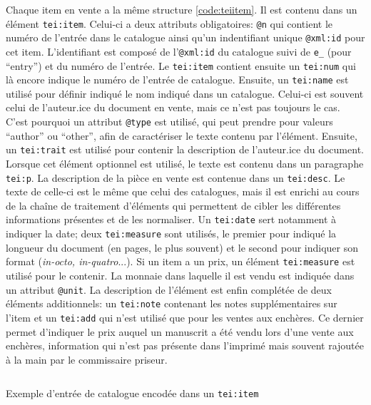 Chaque item en vente a la même structure \ref{code:teiitem}. Il est contenu dans un élément \texttt{tei:item}. Celui-ci a deux attributs obligatoires: \texttt{@n} qui contient le numéro de l'entrée dans le catalogue ainsi qu'un indentifiant unique \texttt{@xml:id} pour cet item. L'identifiant est composé de l'\texttt{@xml:id} du catalogue suivi de \texttt{e\_} (pour \enquote{entry}) et du numéro de l'entrée. Le \texttt{tei:item} contient ensuite un \texttt{tei:num} qui là encore indique le numéro de l'entrée de catalogue. Ensuite, un \texttt{tei:name} est utilisé pour définir indiqué le nom indiqué dans un catalogue. Celui-ci est souvent celui de l'auteur.ice du document en vente, mais ce n'est pas toujours le cas. C'est pourquoi un attribut \texttt{@type} est utilisé, qui peut prendre pour valeurs \enquote{author} ou \enquote{other}, afin de caractériser le texte contenu par l'élément. Ensuite, un \texttt{tei:trait} est utilisé pour contenir la description de l'auteur.ice du document. Lorsque cet élément optionnel est utilisé, le texte est contenu dans un paragraphe \texttt{tei:p}. La description de la pièce en vente est contenue dans un \texttt{tei:desc}. Le texte de celle-ci est le même que celui des catalogues, mais il est enrichi au cours de la chaîne de traitement d'éléments qui permettent de cibler les différentes informations présentes et de les normaliser. Un \texttt{tei:date} sert notamment à indiquer la date; deux \texttt{tei:measure} sont utilisés, le premier pour indiqué la longueur du document (en pages, le plus souvent) et le second pour indiquer son format (\textit{in-octo, in-quatro}...). Si un item a un prix, un élément \texttt{tei:measure} est utilisé pour le contenir. La monnaie dans laquelle il est vendu est indiquée dans un attribut \texttt{@unit}. La description de l'élément est enfin complétée de deux éléments additionnels: un \texttt{tei:note} contenant les notes supplémentaires sur l'item et un \texttt{tei:add} qui n'est utilisé que pour les ventes aux enchères. Ce dernier permet d'indiquer le prix auquel un manuscrit a été vendu lors d'une vente aux enchères, information qui n'est pas présente dans l'imprimé mais souvent rajoutée à la main par le commissaire priseur.

\begin{listing}[h]
	\inputminted{xml}{code/tei_item.xml}
	\caption{Exemple d'entrée de catalogue encodée dans un \texttt{tei:item}}
	\label{code:teiitem}
\end{listing}


